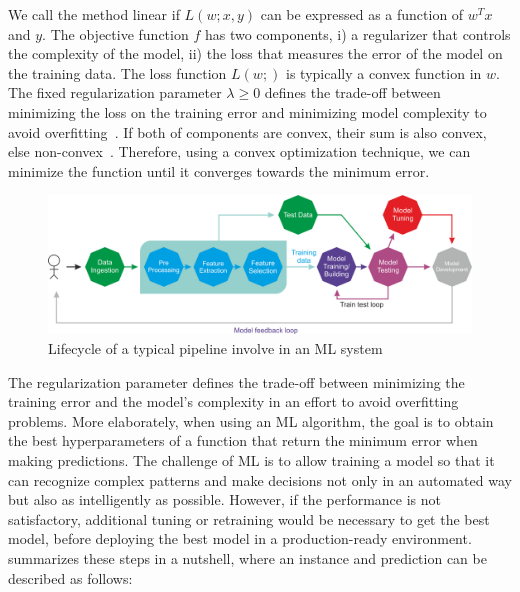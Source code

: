 \hspace*{3.5mm} We call the method linear if $L(w;x,y)$ can be expressed as a function of $w^Tx$ and $y$. The objective function $f$ has two components, i) a regularizer that controls the complexity of the model, ii) the loss that measures the error of the model on the training data. The loss function $L(w;)$ is typically a convex function in $w$. The fixed regularization parameter $\lambda \geq 0$ defines the trade-off between minimizing the loss on the training error and minimizing model complexity to avoid overfitting~\cite{karim2018scala}. If both of components are convex, their sum is also convex, else non-convex~\cite{zaccone2018deep}. Therefore, using a convex optimization technique, we can minimize the function until it converges towards the minimum error.  %

\begin{figure}[h]
	\centering
	\includegraphics[scale=0.6]{images/B08452_01_02.png}
	\caption{Lifecycle of a typical  pipeline involve in an ML system~\cite{karimScalaML2019}} 
	\label{fig:ml_pipeline}
\end{figure}

\hspace*{3.5mm} The regularization parameter defines the trade-off between minimizing the training error and the model's complexity in an effort to avoid overfitting problems. More elaborately, when using an ML algorithm, the goal is to obtain the best hyperparameters of a function that return the minimum error when making predictions. 
The challenge of ML is to allow training a model so that it can recognize complex patterns and make decisions not only in an automated way but also as intelligently as possible. 
However, if the performance is not satisfactory, additional tuning or retraining would be necessary to get the best model, before %
deploying the best model in a production-ready environment. 
 summarizes these steps in a nutshell, where an instance and prediction can be described as follows: 

